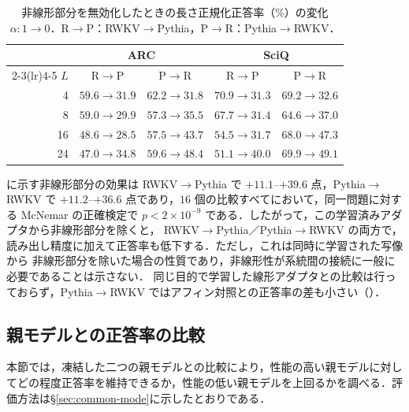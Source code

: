 \documentclass[techrep,noauthor]{ipsj}
\newcommand{\RtoP}{RWKV$\to$\allowbreak Pythia}
\newcommand{\PtoR}{Pythia$\to$\allowbreak RWKV}
\begin{document}
\begin{table}[!t]\centering\small
\caption{非線形部分を無効化したときの長さ正規化正答率（\%）の変化 $\alpha:1\!\to\!0$．R$\to$P：RWKV$\to$Pythia，P$\to$R：Pythia$\to$RWKV．}\label{tab:mlp-intervention}
\setlength{\tabcolsep}{3pt}
{
\begin{tabular}{rcccc}\toprule
& \multicolumn{2}{c}{ARC} & \multicolumn{2}{c}{SciQ}\\
\cmidrule(lr){2-3}\cmidrule(lr){4-5}
$L$ & R$\to$P & P$\to$R & R$\to$P & P$\to$R\\\midrule
4  & $59.6\!\to\!31.9$ & $62.2\!\to\!31.8$ & $70.9\!\to\!31.3$ & $69.2\!\to\!32.6$\\
8  & $59.0\!\to\!29.9$ & $57.3\!\to\!35.5$ & $67.7\!\to\!31.4$ & $64.6\!\to\!37.0$\\
16 & $48.6\!\to\!28.5$ & $57.5\!\to\!43.7$ & $54.5\!\to\!31.7$ & $68.0\!\to\!47.3$\\
24 & $47.0\!\to\!34.8$ & $59.6\!\to\!48.4$ & $51.1\!\to\!40.0$ & $69.9\!\to\!49.1$\\\bottomrule
\end{tabular}}
\end{table}

 に示す非線形部分の効果は \RtoP{} で $+11.1$--$+39.6$ 点，\PtoR{} で
$+11.2$--$+36.6$ 点であり，$16$ 個の比較すべてにおいて，同一問題に対する McNemar の正確検定で
$p<2{\times}10^{-9}$ である．したがって，この学習済みアダプタから非線形部分を除くと，
\RtoP{}／\PtoR{} の両方で，読み出し精度に加えて正答率も低下する．ただし，これは同時に学習された写像から
非線形部分を除いた場合の性質であり，非線形性が系統間の接続に一般に必要であることは示さない．
同じ目的で学習した線形アダプタとの比較は行っておらず，\PtoR{} ではアフィン対照との正答率の差も小さい（）．

\subsection{親モデルとの正答率の比較}\label{sec:goal}
本節では，凍結した二つの親モデルとの比較により，性能の高い親モデルに対してどの程度正答率を維持できるか，性能の低い親モデルを上回るかを調べる．評価方法は\S\ref{sec:common-mode}に示したとおりである．
\end{document}
